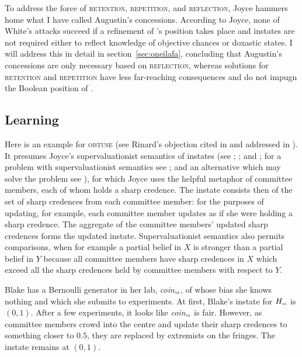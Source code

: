 \documentclass[phd,12pt,oneside]{ubcthesis}
\begin{document}
To address the force of \textsc{retention}, \textsc{repetition}, and
\textsc{reflection}, Joyce hammers home what I have called Augustin's
concessions. According to Joyce, none of White's attacks succeed if a
refinement of {\anderson}'s position takes place and instates are not
required either to reflect knowledge of objective chances or doxastic
states. I will address this in detail in section~\ref{sec:oneilafa},
concluding that Augustin's concessions are only necessary based on
\textsc{reflection}, whereas solutions for \textsc{retention} and
\textsc{repetition} have less far-reaching consequences and do not
impugn the Boolean position of {\anderson}.

\subsection{Learning}
\label{subsec:eeyuquai}

Here is an example for \textsc{obtuse} (see Rinard's objection cited
in  and addressed in ).
It presumes Joyce's supervaluationist semantics of instates (see
; ; and
; for a problem with supervaluationist semantics
see ; and an alternative which may solve the
problem see ), for which Joyce uses the
helpful metaphor of committee members, each of whom holds a sharp
credence. The instate consists then of the set of sharp credences from
each committee member: for the purposes of updating, for example, each
committee member updates as if she were holding a sharp credence. The
aggregate of the committee members' updated sharp credences forms the
updated instate. Supervaluationist semantics also permits comparisons,
when for example a partial belief in $X$ is stronger than a partial
belief in $Y$ because all committee members have sharp credences in
$X$ which exceed all the sharp credences held by committee members
with respect to $Y$.

\begin{quotex}
  \label{ex:learning} Blake has a Bernoulli
  generator in her lab, \textit{coin}$_{\mbox{\tiny{vi}}}$, of whose
  bias she knows nothing and which she submits to experiments. At first,
  Blake's instate for $H_{\mbox{\tiny{vi}}}$ is $(0,1)$. After a few
  experiments, it looks like \textit{coin}$_{\mbox{\tiny{vi}}}$ is
  fair. However, as committee members crowd into the centre and update
  their sharp credences to something closer to $0.5$, they are
  replaced by extremists on the fringes. The instate remains at
  $(0,1)$. 
\end{quotex}
\end{document}
